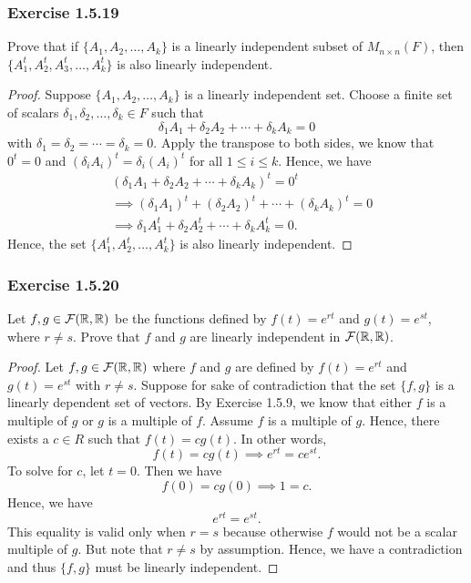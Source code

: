 \subsubsection{Exercise 1.5.19} Prove that if \( \{ A_{1}, A_{2}, \dots, A_{k} \}  \) is a linearly independent subset of \( M_{n \times n }(F) \), then \( \{ A^{t}_{1} , A^{t}_{2} , A^{t}_{3}, \dots, A^{t}_{k } \}  \) is also linearly independent.
\begin{proof}
    Suppose \( \{ A_{1}, A_{2}, \dots, A_{k } \}  \) is a linearly independent set. Choose a finite set of scalars \( \delta_{1} , \delta_{2}, \dots, \delta_{k} \in F \) such that 
    \[  \delta_{1} A_{1} + \delta_{2} A_{2} + \cdots + \delta_{k} A_{k} = 0  \]
with \( \delta_{1} = \delta_{2} = \cdots = \delta_{k } = 0 \).
Apply the transpose to both sides, we know that \( 0^{t} = 0  \) and \((\delta_{i} A_{i})^{t} = \delta_{i} (A_{i})^{t} \) for all \( 1 \leq i \leq k   \).  Hence, we have
\begin{align*}  
    &(  \delta_{1} A_{1} + \delta_{2} A_{2} + \cdots + \delta_{k} A_{k})^{t} = 0^{t}  \\   
    &\implies (  \delta_{1} A_{1} )^{t}  + (\delta_{2} A_{2})^{t}  + \cdots + (\delta_{k} A_{k} )^{t}   = 0  \\
    &\implies \delta_{1} A_{1}^{t} + \delta_{2} A_{2}^{t} + \cdots + \delta_{k } A_{k }^{t} = 0. 
\end{align*}
Hence, the set \( \{ A_{1}^{t} , A_{2}^{t} , \dots, A_{k }^{t} \}  \) is also linearly independent.
\end{proof}

\subsubsection{Exercise 1.5.20} Let \( f,g \in \mathcal{F}(\mathbb{R} , \mathbb{R} ) \) be the functions defined by \( f(t) = e^{rt} \) and \( g(t) = e^{s t  } \), where \( r \neq s  \). Prove that \( f  \) and \( g  \) are linearly independent in \( \mathcal{F}(\mathbb{R} , \mathbb{R} ) \).
\begin{proof}
    Let \( f,g \in \mathcal{F}(\mathbb{R} , \mathbb{R} )  \) where \( f  \) and \( g  \) are defined by \( f(t) = e^{rt}  \) and \( g(t) = e^{s t  } \) with \( r \neq  s  \). Suppose for sake of contradiction that the set \( \{ f,g  \}  \) is a linearly dependent set of vectors. By Exercise 1.5.9, we know that either \( f  \) is a multiple of \( g  \) or \( g  \) is a multiple of \( f  \). Assume \( f  \) is a multiple of \( g  \). Hence, there exists a \(  c \in R  \) such that \( f(t) = c g(t ) \). In other words, 
    \[  f(t) = c g(t) \implies e^{rt} = c e^{s t }. \]
    To solve for \( c  \), let \( t = 0  \). Then we have 
    \[  f(0) = c g(0) \implies 1 = c. \]
    Hence, we have
    \[  e^{rt} = e^{s t }. \]
     This equality is valid only when \( r = s  \) because otherwise \( f  \) would not be a scalar multiple of \( g  \). But note that \( r \neq s  \) by assumption. Hence, we have a contradiction and thus \( \{ f,g  \}  \) must be linearly independent.
\end{proof}

